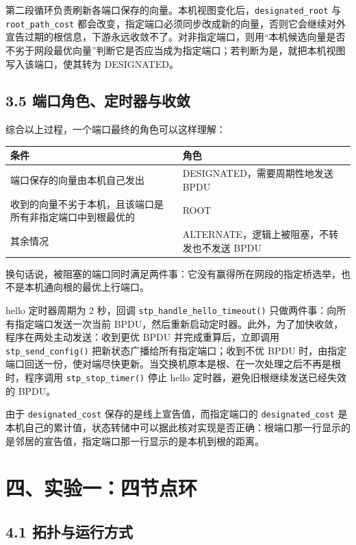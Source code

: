 \documentclass[UTF8,12pt,a4paper,fontset=fandol]{ctexart}
\begin{document}
第二段循环负责刷新各端口保存的向量。本机视图变化后，\texttt{designated\_root} 与 \texttt{root\_path\_cost} 都会改变，指定端口必须同步改成新的向量，否则它会继续对外宣告过期的根信息，下游永远收敛不了。对非指定端口，则用“本机候选向量是否不劣于网段最优向量”判断它是否应当成为指定端口；若判断为是，就把本机视图写入该端口，使其转为 DESIGNATED。

\subsection*{3.5 端口角色、定时器与收敛}

综合以上过程，一个端口最终的角色可以这样理解：

{\small\setlength{\parindent}{0pt}
\begin{tabular}{@{}L{0.62\textwidth}L{0.30\textwidth}@{}}
\toprule
{}\textbf{条件} & \textbf{角色}\\
\midrule
端口保存的向量由本机自己发出 & DESIGNATED，需要周期性地发送 BPDU\\
收到的向量不劣于本机，且该端口是所有非指定端口中到根最优的 & ROOT\\
其余情况 & ALTERNATE，逻辑上被阻塞，不转发也不发送 BPDU\\
\bottomrule
\end{tabular}}

换句话说，被阻塞的端口同时满足两件事：它没有赢得所在网段的指定桥选举，也不是本机通向根的最优上行端口。

hello 定时器周期为 2 秒，回调 \texttt{stp\_handle\_hello\_timeout()} 只做两件事：向所有指定端口发送一次当前 BPDU，然后重新启动定时器。此外，为了加快收敛，程序在两处主动发送：收到更优 BPDU 并完成重算后，立即调用 \texttt{stp\_send\_config()} 把新状态广播给所有指定端口；收到不优 BPDU 时，由指定端口回送一份，使对端尽快更新。当交换机原本是根、在一次处理之后不再是根时，程序调用 \texttt{stp\_stop\_timer()} 停止 hello 定时器，避免旧根继续发送已经失效的 BPDU。

由于 \texttt{designated\_cost} 保存的是线上宣告值，而指定端口的 \texttt{designated\_cost} 是本机自己的累计值，状态转储中可以据此核对实现是否正确：根端口那一行显示的是邻居的宣告值，指定端口那一行显示的是本机到根的距离。

\section*{四、实验一：四节点环}

\subsection*{4.1 拓扑与运行方式}
\end{document}
